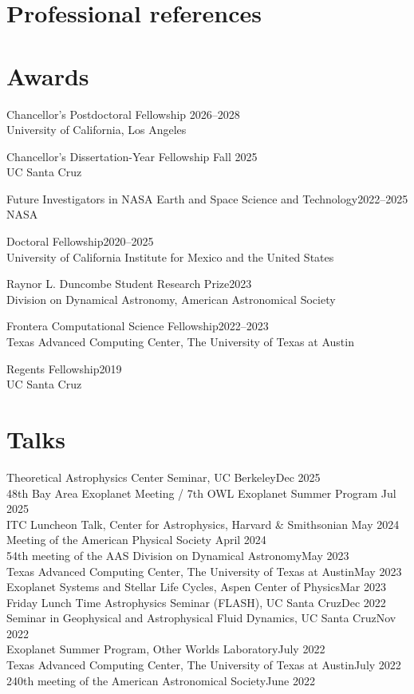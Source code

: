 \documentclass{cv}
\begin{document}
\ifdefined\withreferences{}
\section*{Professional references}

\else\fi

\section*{Awards}
Chancellor's Postdoctoral Fellowship \hfill 2026--2028\\
University of California, Los Angeles

Chancellor's Dissertation-Year Fellowship \hfill Fall 2025\\
UC Santa Cruz

Future Investigators in NASA Earth and Space Science and Technology\hfill 2022--2025\\
NASA

Doctoral Fellowship\hfill2020--2025\\
University of California Institute for Mexico and the United States

Raynor L. Duncombe Student Research Prize\hfill2023\\
Division on Dynamical Astronomy, American Astronomical Society

Frontera Computational Science Fellowship\hfill 2022--2023\\
Texas Advanced Computing Center, The University of Texas at Austin

Regents Fellowship\hfill 2019\\
UC Santa Cruz

\section*{Talks}
Theoretical Astrophysics Center Seminar, UC Berkeley\hfill Dec 2025\\
48th Bay Area Exoplanet Meeting / 7th OWL Exoplanet Summer Program \hfill Jul 2025\\
ITC Luncheon Talk, Center for Astrophysics, Harvard \& Smithsonian \hfill May 2024\\
Meeting of the American Physical Society \hfill April 2024\\
54th meeting of the AAS Division on Dynamical Astronomy\hfill May 2023\\
Texas Advanced Computing Center, The University of Texas at Austin\hfill May 2023\\
Exoplanet Systems and Stellar Life Cycles, Aspen Center of Physics\hfill Mar 2023\\
Friday Lunch Time Astrophysics Seminar (FLASH), UC Santa Cruz\hfill Dec 2022\\
Seminar in Geophysical and Astrophysical Fluid Dynamics, UC Santa Cruz\hfill Nov 2022\\
Exoplanet Summer Program, Other Worlds Laboratory\hfill July 2022\\
Texas Advanced Computing Center, The University of Texas at Austin\hfill July 2022\\
240th meeting of the American Astronomical Society\hfill June 2022
\end{document}
